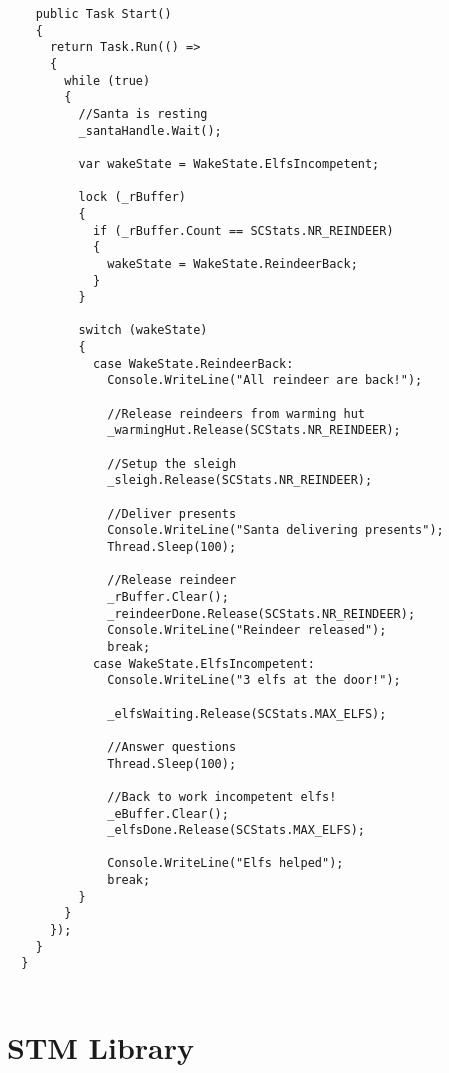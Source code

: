 \begin{lstlisting}
    public Task Start()
    {
      return Task.Run(() =>
      {
        while (true)
        {
          //Santa is resting
          _santaHandle.Wait();

          var wakeState = WakeState.ElfsIncompetent;

          lock (_rBuffer)
          {
            if (_rBuffer.Count == SCStats.NR_REINDEER)
            {
              wakeState = WakeState.ReindeerBack;    
            }
          }

          switch (wakeState)
          {
            case WakeState.ReindeerBack:
              Console.WriteLine("All reindeer are back!");

              //Release reindeers from warming hut
              _warmingHut.Release(SCStats.NR_REINDEER);

              //Setup the sleigh
              _sleigh.Release(SCStats.NR_REINDEER);

              //Deliver presents
              Console.WriteLine("Santa delivering presents");
              Thread.Sleep(100);

              //Release reindeer
              _rBuffer.Clear();
              _reindeerDone.Release(SCStats.NR_REINDEER);
              Console.WriteLine("Reindeer released");
              break;
            case WakeState.ElfsIncompetent:
              Console.WriteLine("3 elfs at the door!");

              _elfsWaiting.Release(SCStats.MAX_ELFS);

              //Answer questions
              Thread.Sleep(100);

              //Back to work incompetent elfs!
              _eBuffer.Clear();
              _elfsDone.Release(SCStats.MAX_ELFS);

              Console.WriteLine("Elfs helped");
              break;
          }
        }
      });
    }
  }
  
\end{lstlisting}


\section{STM Library}\label{app:impl_stm_lib}
\section{\stmname}\label{app:impl_stm_lab}

